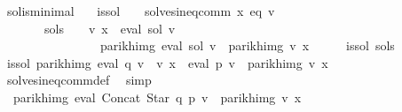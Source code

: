 \begin{isabellebody}
\begin{isamarkuptext}
\end{isamarkuptext}\isamarkuptrue%
\isamarkupfalse%
\ sol{\isacharunderscore}{\kern0pt}is{\isacharunderscore}{\kern0pt}minimal{\isacharcolon}{\kern0pt}\isanewline
\ \ \ is{\isacharunderscore}{\kern0pt}sol{\isacharcolon}{\kern0pt}\ \ \ \ {\isachardoublequoteopen}solves{\isacharunderscore}{\kern0pt}ineq{\isacharunderscore}{\kern0pt}comm\ x\ eq\ v{\isachardoublequoteclose}\isanewline
\ \ \ \ \ \ \ sol{\isacharprime}{\kern0pt}{\isacharunderscore}{\kern0pt}s{\isacharcolon}{\kern0pt}\ \ \ \ {\isachardoublequoteopen}v\ x\ {\isacharequal}{\kern0pt}\ eval\ sol{\isacharprime}{\kern0pt}\ v{\isachardoublequoteclose}\isanewline
\ \ \ \ \ \ \ \ \ \ \ \ \ \ \ \ {\isachardoublequoteopen}parikh{\isacharunderscore}{\kern0pt}img\ {\isacharparenleft}{\kern0pt}eval\ sol\ v{\isacharparenright}{\kern0pt}\ {\isasymsubseteq}\ parikh{\isacharunderscore}{\kern0pt}img\ {\isacharparenleft}{\kern0pt}v\ x{\isacharparenright}{\kern0pt}{\isachardoublequoteclose}\isanewline
%
\isadelimproof
%
\endisadelimproof
%
\isatagproof
{}\isamarkupfalse%
\ {\isacharminus}{\kern0pt}\isanewline
\ \ \isamarkupfalse%
\ is{\isacharunderscore}{\kern0pt}sol\ sol{\isacharprime}{\kern0pt}{\isacharunderscore}{\kern0pt}s\ \isamarkupfalse%
\ is{\isacharunderscore}{\kern0pt}sol{\isacharprime}{\kern0pt}{\isacharcolon}{\kern0pt}\ {\isachardoublequoteopen}parikh{\isacharunderscore}{\kern0pt}img\ {\isacharparenleft}{\kern0pt}eval\ q\ v\ {\isacharat}{\kern0pt}{\isacharat}{\kern0pt}\ v\ x\ {\isasymunion}\ eval\ p\ v{\isacharparenright}{\kern0pt}\ {\isasymsubseteq}\ parikh{\isacharunderscore}{\kern0pt}img\ {\isacharparenleft}{\kern0pt}v\ x{\isacharparenright}{\kern0pt}{\isachardoublequoteclose}\isanewline
\ \ \ \ \isamarkupfalse%
\ solves{\isacharunderscore}{\kern0pt}ineq{\isacharunderscore}{\kern0pt}comm{\isacharunderscore}{\kern0pt}def\ \isamarkupfalse%
\ simp\isanewline
\ \ \isamarkupfalse%
\ \isamarkupfalse%
\ {}{\isacharcolon}{\kern0pt}\ {\isachardoublequoteopen}parikh{\isacharunderscore}{\kern0pt}img\ {\isacharparenleft}{\kern0pt}eval\ {\isacharparenleft}{\kern0pt}Concat\ {\isacharparenleft}{\kern0pt}Star\ q{\isacharparenright}{\kern0pt}\ p{\isacharparenright}{\kern0pt}\ v{\isacharparenright}{\kern0pt}\ {\isasymsubseteq}\ parikh{\isacharunderscore}{\kern0pt}img\ {\isacharparenleft}{\kern0pt}v\ x{\isacharparenright}{\kern0pt}{\isachardoublequoteclose}\isanewline

\end{isabellebody}
